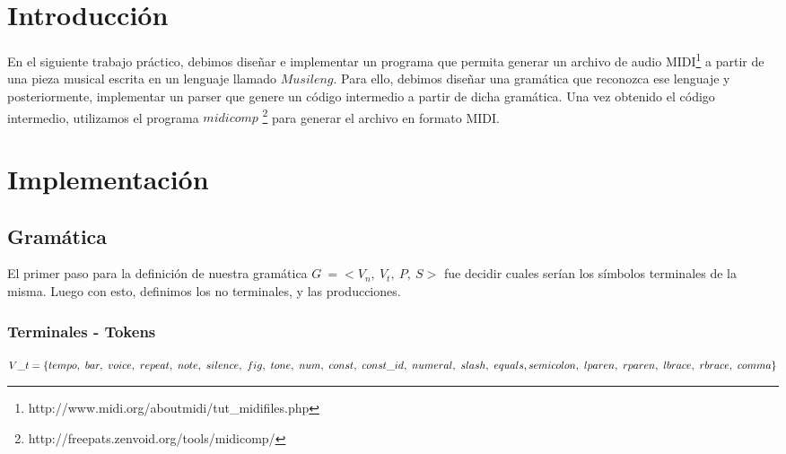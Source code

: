 \documentclass[a4paper, 10pt, twoside]{article}
\begin{document}
\newpage

\tableofcontents

\newpage



\section{Introducción}

En el siguiente trabajo práctico, debimos diseñar e implementar un programa que permita generar un archivo de audio MIDI\footnote{http://www.midi.org/aboutmidi/tut\_midifiles.php} a partir de una pieza musical escrita en un lenguaje llamado $Musileng$. Para ello, debimos diseñar una gramática que reconozca ese lenguaje y posteriormente, implementar un parser que genere un código intermedio a partir de dicha gramática. Una vez obtenido el código intermedio, utilizamos el programa $midicomp$ \footnote{http://freepats.zenvoid.org/tools/midicomp/} para generar el archivo en formato MIDI.



\section{Implementación}
\subsection{Gramática}
El primer paso para la definición de nuestra gramática $G\ = <V_n,\ V_t,\ P,\ S>$ fue decidir cuales serían los símbolos terminales de la misma. Luego con esto, definimos los no terminales, y las producciones.

\subsubsection{Terminales - Tokens}

$V\_t = \{tempo,\ bar,\ voice,\ repeat,\ note,\ silence,\ fig,\ tone,\ num,\ const,\ const\_id,\  numeral,\ slash,\ equals,\\ semicolon,\ lparen,\ rparen,\ lbrace,\ rbrace,\ comma\}$
\end{document}
